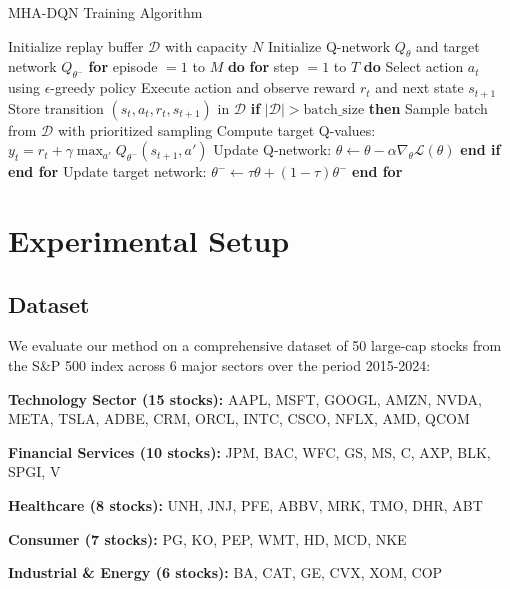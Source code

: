 \documentclass[11pt]{article}
\begin{document}
\begin{algorithm}
\caption{MHA-DQN Training Algorithm}
\begin{algorithmic}[1]
\STATE Initialize replay buffer $\mathcal{D}$ with capacity $N$
\STATE Initialize Q-network $Q_\theta$ and target network $Q_{\theta^-}$
\STATE \textbf{for} episode $= 1$ to $M$ \textbf{do}
\STATE \quad \textbf{for} step $= 1$ to $T$ \textbf{do}
\STATE \quad \quad Select action $a_t$ using $\epsilon$-greedy policy
\STATE \quad \quad Execute action and observe reward $r_t$ and next state $s_{t+1}$
\STATE \quad \quad Store transition $(s_t, a_t, r_t, s_{t+1})$ in $\mathcal{D}$
\STATE \quad \quad \textbf{if} $|\mathcal{D}| > \text{batch\_size}$ \textbf{then}
\STATE \quad \quad \quad Sample batch from $\mathcal{D}$ with prioritized sampling
\STATE \quad \quad \quad Compute target Q-values: $y_t = r_t + \gamma \max_{a'} Q_{\theta^-}(s_{t+1}, a')$
\STATE \quad \quad \quad Update Q-network: $\theta \leftarrow \theta - \alpha \nabla_\theta \mathcal{L}(\theta)$
\STATE \quad \quad \textbf{end if}
\STATE \quad \textbf{end for}
\STATE \quad Update target network: $\theta^- \leftarrow \tau \theta + (1-\tau) \theta^-$
\STATE \textbf{end for}
\end{algorithmic}
\end{algorithm}

\section{Experimental Setup}

\subsection{Dataset}

We evaluate our method on a comprehensive dataset of 50 large-cap stocks from the S\&P 500 index across 6 major sectors over the period 2015-2024:

\textbf{Technology Sector (15 stocks):} AAPL, MSFT, GOOGL, AMZN, NVDA, META, TSLA, ADBE, CRM, ORCL, INTC, CSCO, NFLX, AMD, QCOM

\textbf{Financial Services (10 stocks):} JPM, BAC, WFC, GS, MS, C, AXP, BLK, SPGI, V

\textbf{Healthcare (8 stocks):} UNH, JNJ, PFE, ABBV, MRK, TMO, DHR, ABT

\textbf{Consumer (7 stocks):} PG, KO, PEP, WMT, HD, MCD, NKE

\textbf{Industrial \& Energy (6 stocks):} BA, CAT, GE, CVX, XOM, COP
\end{document}
